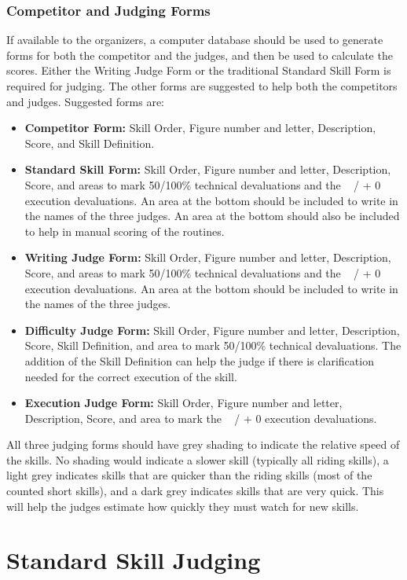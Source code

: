 \subsection{Competitor and Judging Forms}
If available to the organizers, a computer database should be used to generate forms for both the competitor and the judges, and then be used to calculate the scores.
Either the Writing Judge Form or the traditional Standard Skill Form is required for judging.
The other forms are suggested to help both the competitors and judges.
Suggested forms are: 
\begin{itemize}
\item \textbf{Competitor Form:} Skill Order, Figure number and letter, Description, Score, and Skill Definition.
\item \textbf{Standard Skill Form:} Skill Order, Figure number and letter, Description, Score, and areas to mark 50/100\% technical devaluations and the ~ / + 0 execution devaluations.
An area at the bottom should be included to write in the names of the three judges.
An area at the bottom should also be included to help in manual scoring of the routines.
\item \textbf{Writing Judge Form:} Skill Order, Figure number and letter, Description, Score, and areas to mark 50/100\% technical devaluations and the ~ / + 0 execution devaluations.
An area at the bottom should be included to write in the names of the three judges.
\item \textbf{Difficulty Judge Form:} Skill Order, Figure number and letter, Description, Score, Skill Definition, and area to mark 50/100\% technical devaluations.
The addition of the Skill Definition can help the judge if there is clarification needed for the correct execution of the skill.
\item \textbf{Execution Judge Form:} Skill Order, Figure number and letter, Description, Score, and area to mark the ~ / + 0 execution devaluations.
\end{itemize}

All three judging forms should have grey shading to indicate the relative speed of the skills.
No shading would indicate a slower skill (typically all riding skills), a light grey indicates skills that are quicker than the riding skills (most of the counted short skills), and a dark grey indicates skills that are very quick.
This will help the judges estimate how quickly they must watch for new skills.

\chapter{Standard Skill Judging}

